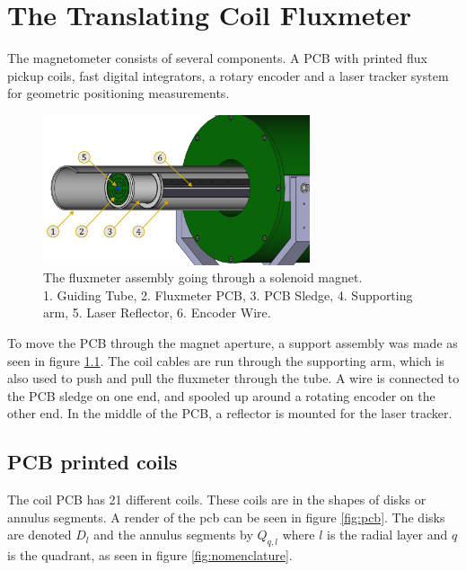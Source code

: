 \chapter{The Translating Coil Fluxmeter}
The magnetometer consists of several components. A PCB with
printed flux pickup coils, fast digital integrators, a rotary
encoder and a laser tracker system for geometric positioning measurements.

\begin{figure}[!h]
    \centering
    \includegraphics[width=0.7\textwidth]{figs/elena}
    \caption{The fluxmeter assembly going through a solenoid magnet. \\
        1. Guiding Tube, 2. Fluxmeter PCB, 3. PCB Sledge, 4. Supporting arm,
        5. Laser Reflector, 6. Encoder Wire.}
    \label{fig:elena}
\end{figure}

To move the PCB through the magnet aperture, a support assembly was made as
seen in figure \ref{fig:elena}. The coil cables are run through the supporting
arm, which is also used to push and pull the fluxmeter through the tube. A
wire is connected to the PCB sledge on one end, and spooled up around
a rotating encoder on the other end. In the middle of the PCB, a
reflector is mounted for the laser tracker.

\section{PCB printed coils}
The coil PCB has 21 different coils.
These coils are in the shapes of disks or annulus segments.
A render of the pcb can be seen in figure
\ref{fig:pcb}. The disks are denoted $D_l$ and the
annulus segments by $Q_{q, l}$ where $l$ is the radial layer and
$q$ is the quadrant, as seen in figure \ref{fig:nomenclature}.

